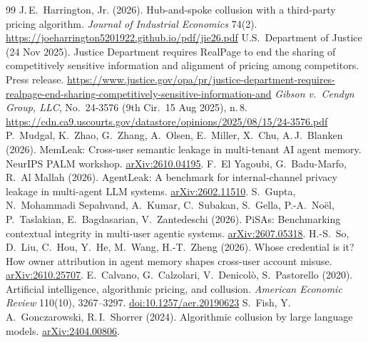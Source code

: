 \documentclass[11pt]{article}
\begin{document}
\begingroup
\small
\renewcommand{\section}[2]{\vspace{4pt}{\large\bfseries References}\par\vspace{2pt}}
\begin{thebibliography}{99}\setlength{\itemsep}{1pt}
 J.\,E.\ Harrington, Jr. (2026). Hub-and-spoke collusion with a third-party pricing algorithm. \emph{Journal of Industrial Economics} 74(2). \url{https://joeharrington5201922.github.io/pdf/jie26.pdf}
 U.S.\ Department of Justice (24 Nov 2025). Justice Department requires RealPage to end the sharing of competitively sensitive information and alignment of pricing among competitors. Press release. \url{https://www.justice.gov/opa/pr/justice-department-requires-realpage-end-sharing-competitively-sensitive-information-and}
 \emph{Gibson v.\ Cendyn Group, LLC}, No.\ 24-3576 (9th Cir.\ 15 Aug 2025), n.\,8. \url{https://cdn.ca9.uscourts.gov/datastore/opinions/2025/08/15/24-3576.pdf}
 P.\ Mudgal, K.\ Zhao, G.\ Zhang, A.\ Olsen, E.\ Miller, X.\ Chu, A.\,J.\ Blanken (2026). MemLeak: Cross-user semantic leakage in multi-tenant AI agent memory. NeurIPS PALM workshop. \href{https://arxiv.org/abs/2610.04195}{arXiv:2610.04195}.
 F.\ El Yagoubi, G.\ Badu-Marfo, R.\ Al Mallah (2026). AgentLeak: A benchmark for internal-channel privacy leakage in multi-agent LLM systems. \href{https://arxiv.org/abs/2602.11510}{arXiv:2602.11510}.
 S.\ Gupta, N.\ Mohammadi Sepahvand, A.\ Kumar, C.\ Subakan, S.\ Gella, P.-A.\ No\"el, P.\ Taslakian, E.\ Bagdasarian, V.\ Zantedeschi (2026). PiSAs: Benchmarking contextual integrity in multi-user agentic systems. \href{https://arxiv.org/abs/2607.05318}{arXiv:2607.05318}.
 H.-S.\ So, D.\ Liu, C.\ Hou, Y.\ He, M.\ Wang, H.-T.\ Zheng (2026). Whose credential is it? How owner attribution in agent memory shapes cross-user account misuse. \href{https://arxiv.org/abs/2610.25707}{arXiv:2610.25707}.
 E.\ Calvano, G.\ Calzolari, V.\ Denicol\`o, S.\ Pastorello (2020). Artificial intelligence, algorithmic pricing, and collusion. \emph{American Economic Review} 110(10), 3267--3297. \href{https://doi.org/10.1257/aer.20190623}{doi:10.1257/aer.20190623}
 S.\ Fish, Y.\,A.\ Gonczarowski, R.\,I.\ Shorrer (2024). Algorithmic collusion by large language models. \href{https://arxiv.org/abs/2404.00806}{arXiv:2404.00806}.

\end{thebibliography}
\end{document}
